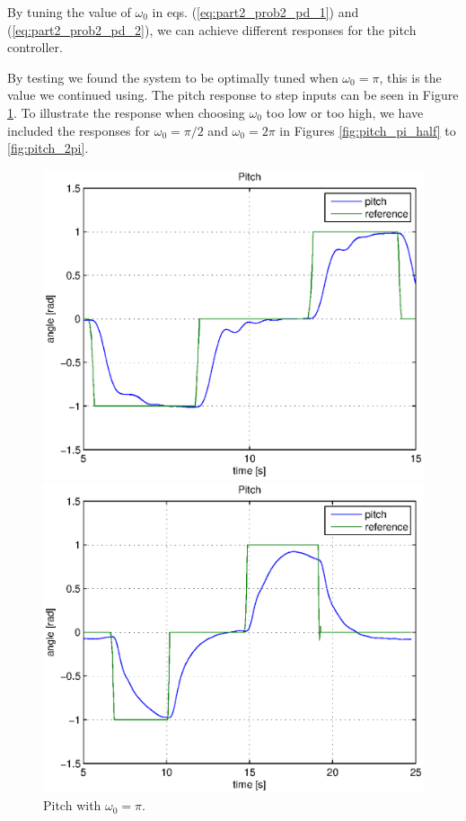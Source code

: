 By tuning the value of $\omega_0$ in eqs. (\ref{eq:part2_prob2_pd_1}) and (\ref{eq:part2_prob2_pd_2}), we can achieve different responses for the pitch controller.
\medskip

By testing we found the system to be optimally tuned when $\omega_0 = \pi$, this is the value we continued using. The pitch response to step inputs can be seen in Figure \ref{fig:pitch_pi}. To illustrate the response when choosing $\omega_0$ too low or too high, we have included the responses for $\omega_0 = \pi/2$ and $\omega_0 = 2\pi$ 
in Figures \ref{fig:pitch_pi_half} to \ref{fig:pitch_2pi}.

\begin{figure}[htb]
	\hspace{-2.7cm}
	\begin{minipage}{.5\textwidth}
	    \centering
		\includegraphics[width=0.9\linewidth]{plots/part2new/pitch_pi.eps}
	    \caption{Pitch with $\omega_0 = \pi$.}
        \label{fig:pitch_pi}
    \end{minipage}%
    \begin{minipage}{.5\textwidth}
        \centering
		\includegraphics[width=0.9\linewidth]{plots/part2new/pitch_pi_half.eps}

\end{minipage}
\end{figure}
